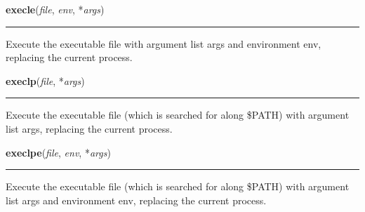     \label{os:execle}

    \vspace{0.5ex}

\hspace{.8\funcindent}\begin{boxedminipage}{\funcwidth}

    \raggedright \textbf{execle}(\textit{file}, \textit{env}, *\textit{args})

    \vspace{-1.5ex}

    \rule{\textwidth}{0.5\fboxrule}
\setlength{\parskip}{2ex}
    Execute the executable file with argument list args and environment 
    env, replacing the current process.

\setlength{\parskip}{1ex}
    \end{boxedminipage}

    \label{os:execlp}

    \vspace{0.5ex}

\hspace{.8\funcindent}\begin{boxedminipage}{\funcwidth}

    \raggedright \textbf{execlp}(\textit{file}, *\textit{args})

    \vspace{-1.5ex}

    \rule{\textwidth}{0.5\fboxrule}
\setlength{\parskip}{2ex}
    Execute the executable file (which is searched for along \$PATH) with 
    argument list args, replacing the current process.

\setlength{\parskip}{1ex}
    \end{boxedminipage}

    \label{os:execlpe}

    \vspace{0.5ex}

\hspace{.8\funcindent}\begin{boxedminipage}{\funcwidth}

    \raggedright \textbf{execlpe}(\textit{file}, \textit{env}, *\textit{args})

    \vspace{-1.5ex}

    \rule{\textwidth}{0.5\fboxrule}
\setlength{\parskip}{2ex}
    Execute the executable file (which is searched for along \$PATH) with 
    argument list args and environment env, replacing the current process.

\setlength{\parskip}{1ex}
    \end{boxedminipage}

